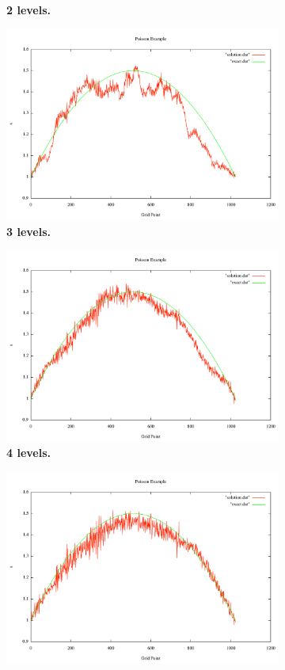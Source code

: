 \documentclass[note]{TechNote}
\begin{document}
\begin{figure}[h!]
\begin{subfigure}[b]{0.3\textwidth}
    \caption{\textbf{2 levels.}}
  \end{subfigure}
  \begin{subfigure}[b]{0.3\textwidth}
    \includegraphics[width=\textwidth]{7_sec_3_level.pdf}
    \caption{\textbf{3 levels.}}
  \end{subfigure}
  \begin{subfigure}[b]{0.3\textwidth}
    \includegraphics[width=\textwidth]{7_sec_4_level.pdf}
    \caption{\textbf{4 levels.}}
  \end{subfigure}
  \begin{subfigure}[b]{0.3\textwidth}
    \includegraphics[width=\textwidth]{7_sec_5_level.pdf}

\end{subfigure}
\end{figure}
\end{document}
